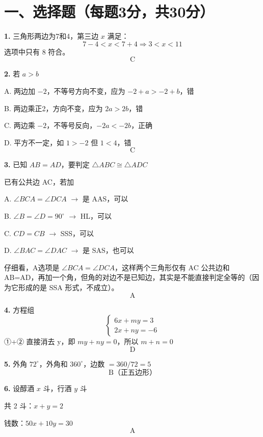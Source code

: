 
\section*{一、选择题（每题3分，共30分）}

\textbf{1.} 三角形两边为7和4，第三边 \(x\) 满足：
\[
7-4 < x < 7+4 \Rightarrow 3 < x < 11
\]
选项中只有 8 符合。
\[
\boxed{\text{C}}
\]

\bigskip

\textbf{2.} 若 \(a > b\)

A. 两边加 \(-2\)，不等号方向不变，应为 \(-2+a > -2+b\)，错

B. 两边乘正2，方向不变，应为 \(2a > 2b\)，错

C. 两边乘 \(-2\)，不等号反向，\(-2a < -2b\)，正确

D. 平方不一定，如 \(1 > -2\) 但 \(1 < 4\)，错
\[
\boxed{\text{C}}
\]

\bigskip

\textbf{3.} 已知 \(AB = AD\)，要判定 \(\triangle ABC \cong \triangle ADC\)

已有公共边 AC，若加

A. \(\angle BCA = \angle DCA\) \(\rightarrow\) 是 AAS，可以

B. \(\angle B = \angle D = 90^\circ\) \(\rightarrow\) HL，可以

C. \(CD = CB\) \(\rightarrow\) SSS，可以

D. \(\angle BAC = \angle DAC\) \(\rightarrow\) 是 SAS，也可以

仔细看，A选项是 \(\angle BCA = \angle DCA\)，这样两个三角形仅有 AC 公共边和 AB=AD，再加一个角，但角的对边不是已知边，其实是不能直接判定全等的（因为它形成的是 SSA 形式，不成立）。
\[
\boxed{\text{A}}
\]

\bigskip

\textbf{4.} 方程组
\[
\begin{cases}
6x + my = 3 \\
2x + ny = -6
\end{cases}
\]
①+② 直接消去 y，即 \(my + ny = 0\)，所以 \(m + n = 0\)
\[
\boxed{\text{D}}
\]

\bigskip

\textbf{5.} 外角 \(72^\circ\)，外角和 \(360^\circ\)，边数 \(= 360/72 = 5\)
\[
\boxed{\text{B（正五边形）}}
\]

\bigskip

\textbf{6.} 设醇酒 \(x\) 斗，行酒 \(y\) 斗

共 2 斗：\(x + y = 2\)

钱数：\(50x + 10y = 30\)
\[
\boxed{\text{A}}
\]

